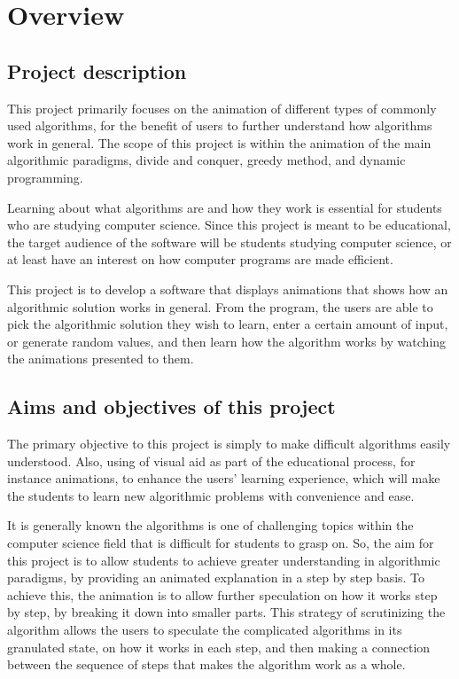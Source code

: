 \chapter{Overview}

\section{Project description}
This project primarily focuses on the animation of different types of commonly used algorithms, for the benefit of users to further understand how algorithms work in general. The scope of this project is within the animation of the main algorithmic paradigms, divide and conquer, greedy method, and dynamic programming. 

Learning about what algorithms are and how they work is essential for students who are studying computer science. Since this project is meant to be educational, the target audience of the software will be students studying computer science, or at least have an interest on how computer programs are made efficient.

This project is to develop a software that displays animations that shows how an algorithmic solution works in general. From the program, the users are able to pick the algorithmic solution they wish to learn, enter a certain amount of input, or generate random values, and then learn how the algorithm works by watching the animations presented to them.

\section{Aims and objectives of this project}
The primary objective to this project is simply to make difficult algorithms easily understood. Also, using of visual aid as part of the educational process, for instance animations, to enhance the users' learning experience, which will make the students to learn new algorithmic problems with convenience and ease.

It is generally known the algorithms is one of challenging topics within the computer science field that is difficult for students to grasp on. So, the aim for this project is to allow students to achieve greater understanding in algorithmic paradigms, by providing an animated explanation in a step by step basis. To achieve this, the animation is to allow further speculation on how it works step by step, by breaking it down into smaller parts. This strategy of scrutinizing the algorithm allows the users to speculate the complicated algorithms in its granulated state, on how it works in each step, and then making a connection between the sequence of steps that makes the algorithm work as a whole.

